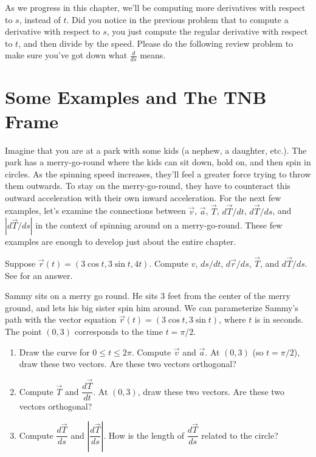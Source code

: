 As we progress in this chapter, we'll be computing more derivatives with respect to $s$, instead of $t$. Did you notice in the previous problem that to compute a derivative with respect to $s$, you just compute the regular derivative with respect to $t$, and then divide by the speed. Please do the following review problem to make sure you've got down what $\frac{d}{ds}$ means. 



\section{Some Examples and The TNB Frame}

Imagine that you are at a park with some kids (a nephew, a daughter, etc.).  The park has a merry-go-round where the kids can sit down, hold on, and then spin in circles. As the spinning speed increases, they'll feel a greater  force trying to throw them  outwards. To stay on the merry-go-round, they have to counteract this outward acceleration with their own inward acceleration. For the next few examples, let's examine the connections between $\vec v$, $\vec a$, $\vec T$, $d\vec T/dt$, $d\vec T/ds$, and $|d\vec T/ds|$ in the context of spinning around on a merry-go-round. These few examples are enough to develop just about the entire chapter. 

\begin{review*}
 Suppose $\vec r(t)=(3\cos t,3\sin t,4t)$.  Compute $v$, $ds/dt$, $d\vec r/ds$, $\vec T$, and $d\vec T/ds$. See 
 for an answer.
\end{review*}


\begin{problem}
 Sammy sits on a merry go round. He sits 3 feet from the center of the merry ground, and lets his big sister spin him around. We can parameterize Sammy's path with the vector equation $\vec r(t) = (3\cos t, 3\sin t)$, where $t$ is in seconds.  The point $(0,3)$ corresponds to the time $t=\pi/2$.
\begin{enumerate}
 \item Draw the curve for $0\leq t\leq 2\pi$. Compute $\vec v$ and $\vec a$. At $(0,3)$ (so $t=\pi/2$), draw these two vectors. Are these two vectors orthogonal? 
 \item Compute $\vec T$ and $\dfrac{d\vec T}{dt}$. At $(0,3)$, draw these two vectors. Are these two vectors orthogonal? 
 \item Compute $\dfrac{d\vec T}{ds}$ and $\left|\dfrac{d\vec T}{ds}\right|$. How is the length of $\dfrac{d\vec T}{ds}$ related to the circle?  
\end{enumerate}
\end{problem}


